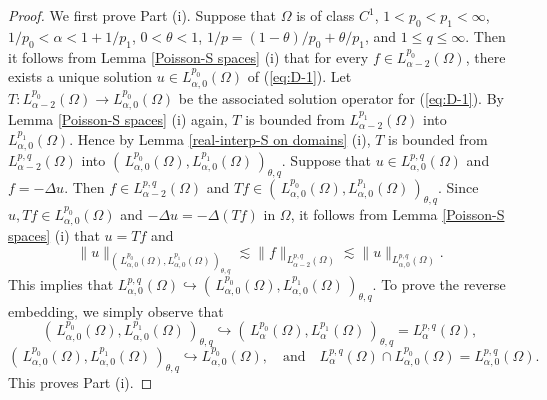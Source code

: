 \documentclass[reqno,centertags,11pt]{amsart}
\theoremstyle{definition}
\numberwithin{thm}{section}
\numberwithin{equation}{section}
\begin{document}
\begin{proof}
We first  prove Part (i).    Suppose that $\Omega$ is of class $C^1$, $1<p_0 < p_1 <\infty$, $1/p_0 <\alpha<1+ 1/p_1$, $0< \theta < 1$, $1/p=(1-\theta)/p_0 +\theta/p_1$, and $1 \le q \le \infty$.
Then it follows from Lemma \ref{Poisson-S spaces} (i)  that for every $f \in L_{\alpha-2}^{p_0} (\Omega )$, there exists a unique solution $u \in L_{\alpha,0}^{p_0} (\Omega )$ of  (\ref{eq:D-1}). Let   $T : L_{\alpha-2}^{p_0} (\Omega ) \to L_{\alpha,0}^{p_0} (\Omega )$ be the associated  solution operator for (\ref{eq:D-1}).  By Lemma \ref{Poisson-S spaces} (i) again, $T$ is   bounded from  $L_{\alpha-2}^{p_1} (\Omega )$ into $ L_{\alpha,0}^{p_1} (\Omega )$.
Hence by  Lemma \ref{real-interp-S on domains} (i), $T$ is bounded from $   L_{\alpha-2}^{p,q}(\Omega ) $ into $\left(\,  L_{\alpha,0}^{p_0}(\Omega ) , L_{\alpha,0}^{p_1}(\Omega ) \, \right)_{\theta,q}$.
 Suppose that  $u \in L_{\alpha, 0}^{p,q} (\Omega )$ and $f= -\Delta u$. Then $f \in  L_{\alpha-2}^{p,q}(\Omega )$ and $Tf \in \left(\,  L_{\alpha,0}^{p_0}(\Omega ) , L_{\alpha,0}^{p_1}(\Omega ) \, \right)_{\theta,q}$. Since $u, Tf \in L_{\alpha,0}^{p_0}(\Omega )$ and $-\Delta u =-\Delta (Tf)$ in $\Omega$, it follows from Lemma \ref{Poisson-S spaces} (i) that
$u =Tf$ and
$$
\|u\|_{\left(\,  L_{\alpha,0}^{p_0}(\Omega ) , L_{\alpha,0}^{p_1}(\Omega ) \, \right)_{\theta,q}} \lesssim \|f\|_{L_{\alpha-2}^{p,q}(\Omega )} \lesssim  \|u\|_{L_{\alpha, 0}^{p,q} (\Omega )}.
$$
This implies that $L_{\alpha, 0}^{p,q} (\Omega ) \hookrightarrow \left(\,  L_{\alpha,0}^{p_0}(\Omega ) , L_{\alpha,0}^{p_1}(\Omega ) \, \right)_{\theta,q}$. To prove the reverse embedding, we simply observe  that
$$
\left(\,  L_{\alpha,0}^{p_0}(\Omega ) , L_{\alpha,0}^{p_1}(\Omega ) \, \right)_{\theta,q} \hookrightarrow \left(\,  L_{\alpha}^{p_0}(\Omega ) , L_{\alpha}^{p_1}(\Omega ) \, \right)_{\theta,q} = L_{\alpha}^{p,q} (\Omega )
,
$$
$$
\left(\,  L_{\alpha,0}^{p_0}(\Omega ) , L_{\alpha,0}^{p_1}(\Omega ) \, \right)_{\theta,q} \hookrightarrow L_{\alpha,0}^{p_0}(\Omega ),\quad\mbox{and}\quad
L_{\alpha}^{p,q} (\Omega )\cap  L_{\alpha,0}^{p_0}(\Omega ) = L_{\alpha,0}^{p,q}(\Omega ).
$$
This proves Part (i).


\end{proof}
\end{document}
